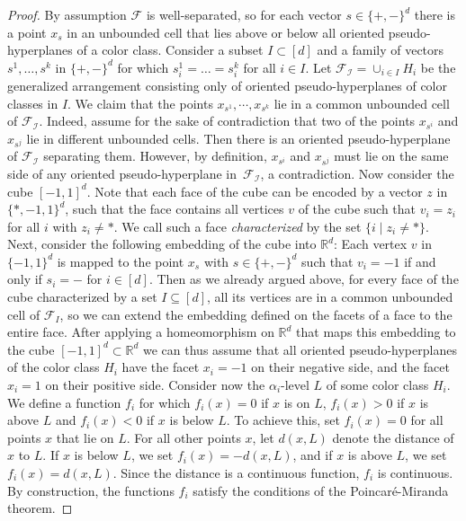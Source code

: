 \documentclass[11pt]{article}
\newcommand{\R}{\mathbb{R}}
\begin{document}
\begin{proof}
By assumption $\mathcal{F}$ is well-separated, so for each vector $s \in \{+, -\}^d$ there is a point $x_s$ in an unbounded cell that lies above or below all oriented pseudo-hyperplanes of a color class. Consider a subset $I\subset [d]$ and a family of vectors $s^1,\ldots,s^k$ in $\{+, -\}^d$ for which $s_i^1=\ldots =s_i^k$ for all $i\in I$. Let $\mathcal{F_{I}}=\cup_{i\in I} H_i$ be the generalized arrangement consisting only of oriented pseudo-hyperplanes of color classes in $I$. We claim that the points $x_{s^1},\cdots,x_{s^k}$ lie in a common unbounded cell of $\mathcal{F_{I}}$. Indeed, assume for the sake of contradiction that two of the points $x_{s^i}$ and $x_{s^j}$ lie in different unbounded cells. Then there is an oriented pseudo-hyperplane of $\mathcal{F_{I}}$ separating them. However, by definition, $x_{s^i}$ and $x_{s^j}$ must lie on the same side of any oriented pseudo-hyperplane in~$\mathcal{F_{I}}$, a contradiction.
%
%
Now consider the cube $[-1,1]^d$.
Note that each face of the cube can be encoded by a vector $z$ in $\{*,-1,1\}^d$, such that the face contains all vertices $v$ of the cube such that $v_i = z_i$ for all $i$ with $z_i \neq *$.
We call such a face \emph{characterized} by the set $\{i \mid z_i \neq *\}$. 
%
Next, consider the following embedding of the cube into $\R^d$: Each vertex $v$ in $\{-1,1\}^d$ is mapped to the point $x_s$ with $s \in \{+,-\}^d$ such that $v_i = -1$ if and only if $s_i = -$ for $i \in [d]$.
Then as we already argued above, for every face of the cube characterized by a set $I \subseteq [d]$, all its vertices are in a common unbounded cell of $\mathcal{F}_I$, so we can extend the embedding defined on the facets of a face to the entire face.
%
After applying a homeomorphism on $\mathbb{R}^d$ that maps this embedding to the cube $[-1,1]^d\subset\mathbb{R}^d$ we can thus assume that all oriented pseudo-hyperplanes of the color class $H_i$ have the facet $x_i=-1$ on their negative side, and the facet $x_i=1$ on their positive side.
%
Consider now the $\alpha_i$-level $L$ of some color class $H_i$. We define a function $f_i$ for which $f_i(x)=0$ if $x$ is on $L$, $f_i(x)>0$ if $x$ is above $L$ and $f_i(x)<0$ if $x$ is below $L$. To achieve this, set $f_i(x) = 0$ for all points $x$ that lie on $L$. For all other points $x$, let $d(x, L)$ denote the distance of $x$ to $L$. If $x$ is below $L$, we set $f_i(x) = -d(x, L)$, and if $x$ is above $L$, we set $f_i(x) = d(x, L)$. Since the distance is a continuous function, $f_i$ is continuous. 
%
By construction, the functions $f_i$ satisfy the conditions of the Poincar\'{e}-Miranda theorem.

\end{proof}
\end{document}
